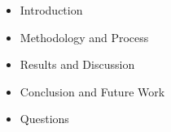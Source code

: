 \begin{frame}

  \begin{itemize}
    \item Introduction
    \item Methodology and Process
    \item Results and Discussion  
    \item Conclusion and Future Work
    \item Questions
  \end{itemize}
  
\end{frame}